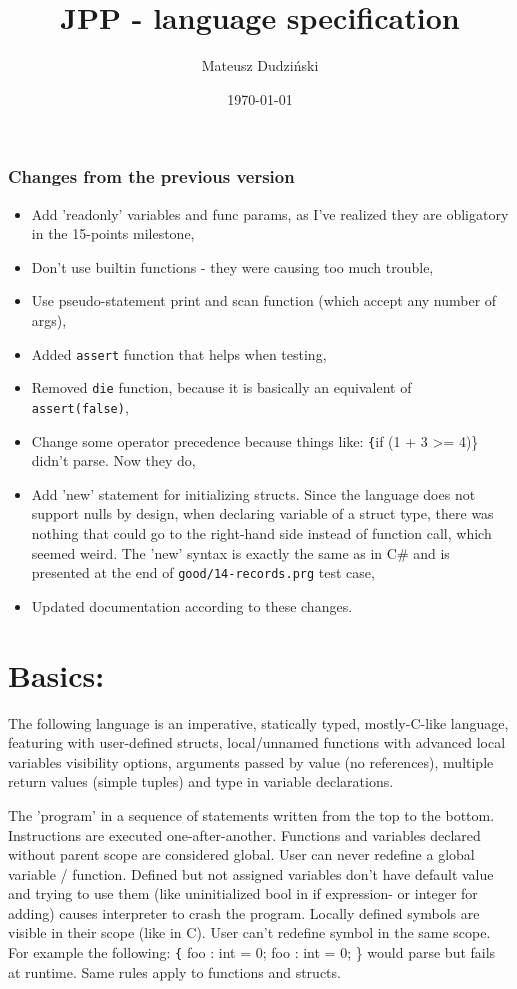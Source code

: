 \documentclass[11pt]{article}
\author{Mateusz Dudziński}
\date{\today}
\title{JPP - language specification}
\begin{document}
\maketitle

\subsubsection*{Changes from the previous version}
\label{sec:orgd45f91c}
\begin{itemize}
\item Add 'readonly' variables and func params, as I've realized they are
obligatory in the 15-points milestone,
\item Don't use builtin functions - they were causing too much trouble,
\item Use pseudo-statement print and scan function (which accept any number of
args),
\item Added \texttt{assert} function that helps when testing,
\item Removed \texttt{die} function, because it is basically an equivalent of
\texttt{assert(false)},
\item Change some operator precedence because things like: \texttt\{if (1 + 3 >=
4)\} didn't parse. Now they do,
\item Add 'new' statement for initializing structs. Since the language does not
support nulls by design, when declaring variable of a struct type, there was
nothing that could go to the right-hand side instead of function call, which
seemed weird. The 'new' syntax is exactly the same as in C\# and is presented
at the end of \texttt{good/14-records.prg} test case,
\item Updated documentation according to these changes.
\end{itemize}


\section*{Basics:}
\label{sec:orgdf99fc8}
The following language is an imperative, statically typed, mostly-C-like
language, featuring with user-defined structs, local/unnamed functions with
advanced local variables visibility options, arguments passed by value (no
references), multiple return values (simple tuples) and type in variable
declarations.

The 'program' in a sequence of statements written from the top to the bottom.
Instructions are executed one-after-another.  Functions and variables declared
without parent scope are considered global.  User can never redefine a global
variable / function. Defined but not assigned variables don't have default
value and trying to use them (like uninitialized bool in if expression- or
integer for adding) causes interpreter to crash the program. Locally defined
symbols are visible in their scope (like in C). User can't redefine symbol in
the same scope. For example the following: \texttt\{ foo : int = 0; foo : int =
0; \} would parse but fails at runtime. Same rules apply to functions and
structs.
\end{document}
